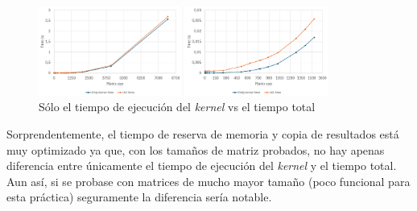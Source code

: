 \begin{figure}[h]
    \centering
    \includegraphics[width=0.85\textwidth]{img/4.png}
    \caption{Sólo el tiempo de ejecución del \textit{kernel} vs el tiempo total}
    \label{fig:4}
\end{figure}

Sorprendentemente, el tiempo de reserva de memoria y copia de resultados está muy optimizado ya que, con los tamaños de 
matriz probados, no hay apenas diferencia entre únicamente el tiempo de ejecución del \textit{kernel} y el tiempo total.
Aun así, si se probase con matrices de mucho mayor tamaño (poco funcional para esta práctica) seguramente la diferencia
sería notable.

